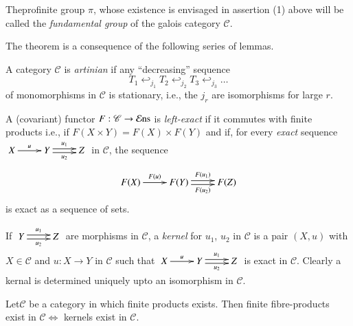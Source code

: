 The\pageoriginale profinite group $\pi$, whose existence is envisaged
in assertion (1) above will be called the {\em fundamental group} of
the galois category $\mathscr{C}$.

The theorem is a consequence of the following series of lemmas.

\setcounter{subsubsection}{1}
\setcounter{subdefin}{0}
\begin{subdefin}\label{chap4-defi4.4.1.1}
A category $\mathscr{C}$ is {\em artinian} if any ``decreasing''
sequence
$$
T_{1}\hookleftarrow_{j_{1}}T_{2}\hookleftarrow_{j_{2}}T_{3}\hookleftarrow_{j_{3}}\ldots 
$$
of monomorphisms in $\mathscr{C}$ is stationary, i.e., the $j_{r}$ are
isomorphisms for large $r$.
\end{subdefin}

A (covariant) functor $F:\mathscr{C}\to \operatorname{\mathcal{E}ns}$ is {\em left-exact}
if it commutes with finite products i.e., if $F(X\times Y)=F(X)\times
F(Y)$ and if, for every {\em exact} sequence $\xymatrix{X\ar[r]^{u} &
  Y\ar@<.2em>[r]^{u_{1}}\ar@<-.2em>[r]_{u_{2}} & Z}$ in $\mathscr{C}$,
the sequence  
\[
\xymatrix{F(X)\ar[r]^{F(u)} &
  F(Y)\ar@<.2em>[r]^{F(u_{1})}\ar@<-.2em>[r]_{F(u_{2})} & F(Z)}
\] 
is exact as a sequence of sets.

If $\xymatrix{Y\ar@<.2em>[r]^{u_{1}}\ar@<-.2em>[r]_{u_{2}} & Z}$
 are morphisms in $\mathscr{C}$, a {\em kernel} for $u_{1}$, $u_{2}$
 in $\mathscr{C}$ is a pair $(X,u)$ with $X\in \mathscr{C}$ and
 $u:X\to Y$ in $\mathscr{C}$ such that $\xymatrix{X\ar[r]^{u} &
  Y\ar@<.2em>[r]^{u_{1}}\ar@<-.2em>[r]_{u_{2}} & Z}$ is exact in
 $\mathscr{C}$. Clearly a kernal is determined uniquely upto an
 isomorphism in $\mathscr{C}$. 

\setcounter{sublemma}{1}
\begin{sublemma}\label{chap4-lem4.4.1.2}
Let\pageoriginale $\mathscr{C}$ be a category in which finite products
exists. Then finite fibre-products exist in
$\mathscr{C}\Leftrightarrow$ kernels exist in $\mathscr{C}$.
\end{sublemma}


